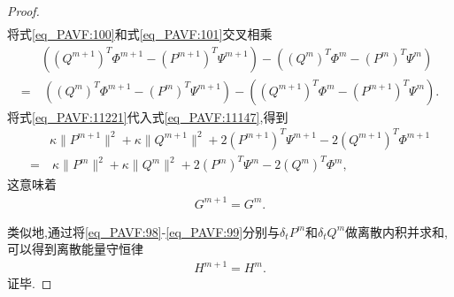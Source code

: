 \begin{proof}
\begin{align}
\end{align}
将式\eqref{eq_PAVF:100}和式\eqref{eq_PAVF:101}交叉相乘
\begin{align}\label{eq_PAVF:11221}
&((Q^{m+1})^{T}\varPhi^{m+1}-(P^{m+1})^{T}\Psi^{m+1})-((Q^{m})^{T}\varPhi^{m}-(P^{m})^{T}\Psi^{m})\nonumber\\
=&~((Q^{m})^{T}\varPhi^{m+1}-(P^{m})^{T}\Psi^{m+1})-((Q^{m+1})^{T}\varPhi^{m}-(P^{m+1})^{T}\Psi^{m}).
\end{align}
将式\eqref{eq_PAVF:11221}代入式\eqref{eq_PAVF:11147},得到
\begin{align}
&\kappa \|P^{m+1}\|^2+\kappa \|Q^{m+1}\|^2+2(P^{m+1})^{T}\Psi^{m+1}-2(Q^{m+1})^{T}\varPhi^{m+1}\nonumber
\\=&~\kappa \|P^{m}\|^2+\kappa \|Q^{m}\|^2+2(P^{m})^{T}\Psi^{m}-2(Q^{m})^{T}\varPhi^{m},\label{eq_PAVF:11155}
\end{align}
这意味着
\begin{align}\label{eq_PAVF:11149}
G^{m+1}=G^{m} .
\end{align}

类似地,通过将\eqref{eq_PAVF:98}-\eqref{eq_PAVF:99}分别与$\delta_t P^{m}$和$\delta_t Q^{m}$做离散内积并求和, 可以得到离散能量守恒律
\begin{align}\label{eq_PAVF:11156}
H^{m+1}=H^{m}.
\end{align}
证毕.
\end{proof}

